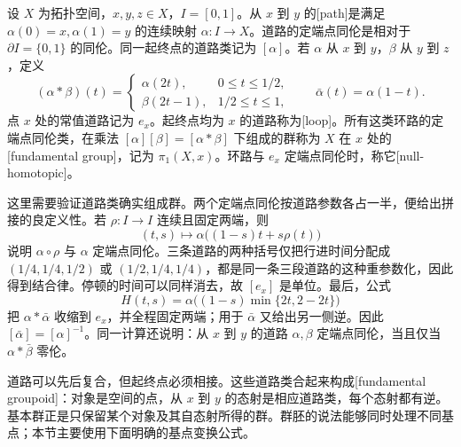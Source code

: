 \begin{definition}[道路与基本群]\label{g2:def:fundamental-group}
	设 \(X\) 为拓扑空间，\(x,y,z\in X\)，\(I=[0,1]\)。从 \(x\) 到 \(y\) 的[path]是满足 \(\alpha(0)=x,\alpha(1)=y\) 的连续映射 \(\alpha:I\rightarrow X\)。道路的定端点同伦是相对于 \(\partial I=\{0,1\}\) 的同伦。同一起终点的道路类记为 \([\alpha]\)。若 \(\alpha\) 从 \(x\) 到 \(y\)，\(\beta\) 从 \(y\) 到 \(z\)，定义
	\[
		(\alpha*\beta)(t)=
		\begin{cases}
			\alpha(2t),&0\leq t\leq1/2,\\
			\beta(2t-1),&1/2\leq t\leq1,
		\end{cases}
		\qquad \bar\alpha(t)=\alpha(1-t).
	\]
	点 \(x\) 处的常值道路记为 \(e_x\)。起终点均为 \(x\) 的道路称为[loop]。所有这类环路的定端点同伦类，在乘法 \([\alpha][\beta]=[\alpha*\beta]\) 下组成的群称为 \(X\) 在 \(x\) 处的[fundamental group]，记为 \(\pi_1(X,x)\)。环路与 \(e_x\) 定端点同伦时，称它[null-homotopic]。
\end{definition}

这里需要验证道路类确实组成群。两个定端点同伦按道路参数各占一半，便给出拼接的良定义性。若 \(\rho:I\rightarrow I\) 连续且固定两端，则
\[
	(t,s)\longmapsto\alpha\bigl((1-s)t+s\rho(t)\bigr)
\]
说明 \(\alpha\circ\rho\) 与 \(\alpha\) 定端点同伦。三条道路的两种括号仅把行进时间分配成 \((1/4,1/4,1/2)\) 或 \((1/2,1/4,1/4)\)，都是同一条三段道路的这种重参数化，因此得到结合律。停顿的时间可以同样消去，故 \([e_x]\) 是单位。最后，公式
\[
	H(t,s)=\alpha\bigl((1-s)\min\{2t,2-2t\}\bigr)
\]
把 \(\alpha*\bar\alpha\) 收缩到 \(e_x\)，并全程固定两端；用于 \(\bar\alpha\) 又给出另一侧逆。因此 \([\bar\alpha]=[\alpha]^{-1}\)。同一计算还说明：从 \(x\) 到 \(y\) 的道路 \(\alpha,\beta\) 定端点同伦，当且仅当 \(\alpha*\bar\beta\) 零伦。

\ProseParagraphBreak

道路可以先后复合，但起终点必须相接。这些道路类合起来构成[fundamental groupoid]：对象是空间的点，从 \(x\) 到 \(y\) 的态射是相应道路类，每个态射都有逆。基本群正是只保留某个对象及其自态射所得的群。群胚的说法能够同时处理不同基点；本节主要使用下面明确的基点变换公式。

